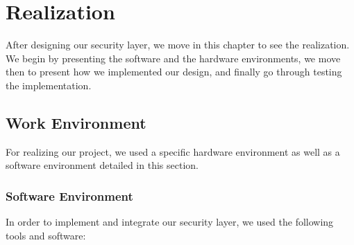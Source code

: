 %
%
%
%
%

\chapter{Realization}

After designing our security layer, we move in this chapter to see the realization.
We begin by presenting the software and the hardware environments, we move then to present how we implemented
our design, and finally go through testing the implementation.

\section{Work Environment}

For realizing our project, we used a specific hardware
environment as well as a software environment detailed in this section.

\subsection{Software Environment}

In order to implement and integrate our security layer, we used the following tools and software:

